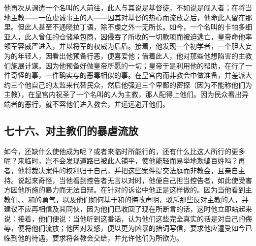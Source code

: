 他再次从调遣一个名叫的人前往，此人与其说是基督徒，不如说是闯入者；在将当地主教——一位虔诚事主的人——因其对基督的热心而流放之后，他命此人留在那里。但此人甚至不通晓拉丁语，除不虔之外一无所长。如今，一个名叫的卡帕多细亚人，此人曾任的仓储承包商，因侵吞了所收的一切款项而被迫逃亡，皇帝命他率领军容威严进入，并以将军的权威为后盾。接着，他发现一个初学者，一个胆大妄为的年轻人，因看出他预备行恶，便喜爱他；借着此人，他对那些他想陷害的主教们施展计谋。因为他预备好做皇帝所愿的一切；皇帝于是利用他的帮助，在行了一件奇怪的事，一件确实与的恶毒相似的事。在皇宫内而非教会中做准备，并差派大约三个他自己的太监来代替民众，然后他强迫三个卑鄙的密探（因为不能称他们为主教），在皇宫内祝圣了一个名叫的人为主教，那人配得上他们。因为民众看出异端者的恶行，就不容他们进入教会，并远远避开他们。\par


\subsection{七十六、对主教们的暴虐流放}

如今，还缺什么使他成为呢？或者来临时所能行的，还有什么比这人所行的更多呢？来临时，岂不会发现道路已被此人铺平，使他能轻而易举地欺骗百姓吗？再者，他将裁决案件的权利归于自己，并把这些案件提交法庭而非教会，且亲自主持。说起来奇怪，当他看到控告者无言以对时，他便自己担当控告者，如此使受害方因他所施的暴力而无法自辩。在针对的诉讼中他正是这样做的。因为当他看到主教们、、和的勇气，以及他们如何基于和的悔改声明，驳斥那些反对主教的人，并建议不应再相信及其同伙，因为他们已收回了现在所断言的话，这时他立即站起来说：接着，他们便说：当他听到这番话，认为他们这些完全真实的话是对自己的侮辱，便将他们流放；他因对发怒，便以更为凶暴的措词写信，要求他应遭受如今已临到他的待遇，要求将各教会交给，并允许他们为所欲为。\par

